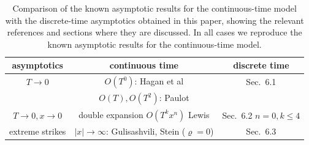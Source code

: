 \documentclass[11pt]{article}
\numberwithin{equation}{section}
\theoremstyle{plain}
\begin{document}
\begin{table}
\caption{\label{tab:summary} 
Comparison of the known asymptotic results for the continuous-time model
with the discrete-time asymptotics obtained in this paper, showing the relevant
references and sections where they are discussed. In all cases we reproduce
the known asymptotic results for the continuous-time model.}
\begin{center}
\begin{tabular}{|c|c|c|}
\hline
asymptotics  & continuous time & discrete time  \\
\hline \hline
$T\to 0$ & $O(T^0)$: Hagan et al \cite{SABR}
         & Sec.~6.1 \\
         & $O(T), O(T^2)$: Paulot \cite{Paulot}
         &  \\
\hline
$T\to 0, x\to 0$ & double expansion $O(T^k x^n)$ Lewis \cite{Lewis,Lewis2017}
         & Sec.~6.2 $n=0,k\leq 4$ \\
\hline
extreme strikes & $|x|\to \infty$: Gulisashvili, Stein ($\varrho=0$) \cite{GSHW}
         & Sec.~6.3 \\
\hline 
\end{tabular}
\end{center}
\end{table}
\end{document}
